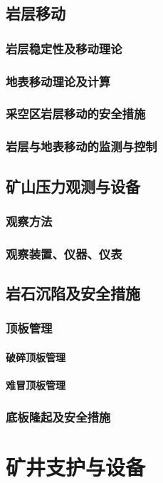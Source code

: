 \documentclass[UTF8]{../../ApplicationUniverse}
\begin{document}
    \subsection{岩层移动}
        \subsubsection{岩层稳定性及移动理论}
        \subsubsection{地表移动理论及计算}
        \subsubsection{采空区岩层移动的安全措施}
        \subsubsection{岩层与地表移动的监测与控制}
    \subsection{矿山压力观测与设备}
        \subsubsection{观察方法}
        \subsubsection{观察装置、仪器、仪表}
    \subsection{岩石沉陷及安全措施}
        \subsubsection{顶板管理}
            \paragraph{破碎顶板管理}
            \paragraph{难冒顶板管理}
        \subsubsection{底板隆起及安全措施}
\section{矿井支护与设备}
\end{document}
